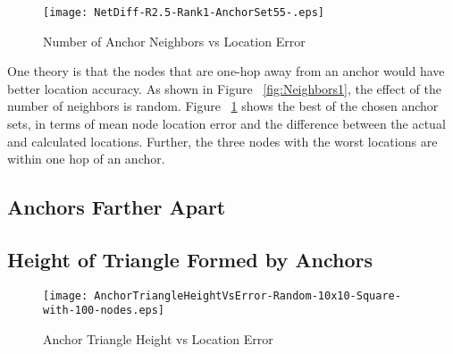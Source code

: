 \begin{figure}
  \centering
    \texttt{[image: NetDiff-R2.5-Rank1-AnchorSet55-.eps]}
    \caption{Number of Anchor Neighbors vs Location Error}
    \label{fig:Neighbors1Network}
\end{figure}

One theory is that the nodes that are one-hop away from an anchor would have better location accuracy.  As shown in Figure ~\ref{fig:Neighbors1}, the effect of the number of neighbors is random.  Figure ~\ref{fig:Neighbors1Network} shows the best of the chosen anchor sets, in terms of mean node location error and the difference between the actual and calculated locations.  Further, the three nodes with the worst locations are within one hop of an anchor.


\subsection{Anchors Farther Apart}


\subsection{Height of Triangle Formed by Anchors}

\begin{figure}
  \centering
    \texttt{[image: AnchorTriangleHeightVsError-Random-10x10-Square-with-100-nodes.eps]}
    \caption{Anchor Triangle Height vs Location Error}
    \label{fig:Height1}
\end{figure}

